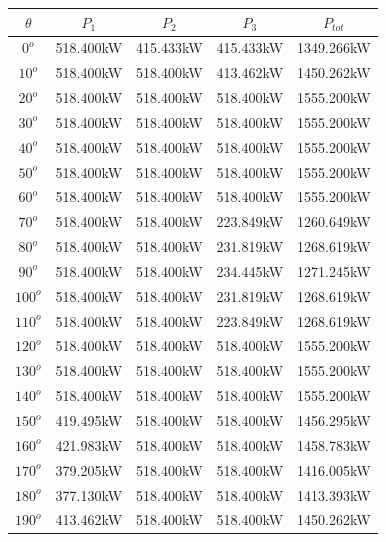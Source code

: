 	\singlespacing
	\begin{table}[H]
	    \centering
	    \begin{tabular}{|c|c|c|c|c|}
	     \hline
	     $\theta$ & $P_{1}$ & $P_{2}$ & $P_{3}$ & $P_{tot}$ \\
	     \hline
	     $0^{o}$ & 518.400kW & 415.433kW & 415.433kW & 1349.266kW \\
	     \hline
	     $10^{o}$ & 518.400kW & 518.400kW & 413.462kW & 1450.262kW \\
	     \hline
	     $20^{o}$ & 518.400kW & 518.400kW & 518.400kW & 1555.200kW \\
	     \hline
	     $30^{o}$ & 518.400kW & 518.400kW & 518.400kW & 1555.200kW \\
	     \hline
	     $40^{o}$ & 518.400kW & 518.400kW & 518.400kW & 1555.200kW \\
	     \hline
	     $50^{o}$ & 518.400kW & 518.400kW & 518.400kW & 1555.200kW \\
	     \hline
	     $60^{o}$ & 518.400kW & 518.400kW & 518.400kW & 1555.200kW \\
	     \hline
	     $70^{o}$ & 518.400kW & 518.400kW & 223.849kW & 1260.649kW \\
	     \hline
	     $80^{o}$ & 518.400kW & 518.400kW & 231.819kW & 1268.619kW \\
	     \hline
	     $90^{o}$ & 518.400kW & 518.400kW & 234.445kW & 1271.245kW \\
	     \hline
	     $100^{o}$ & 518.400kW & 518.400kW & 231.819kW & 1268.619kW \\
	     \hline
	     $110^{o}$ & 518.400kW & 518.400kW & 223.849kW & 1268.619kW \\
	     \hline
	     $120^{o}$ & 518.400kW & 518.400kW & 518.400kW & 1555.200kW \\
	     \hline
	     $130^{o}$ & 518.400kW & 518.400kW & 518.400kW & 1555.200kW \\
	     \hline
	     $140^{o}$ & 518.400kW & 518.400kW & 518.400kW & 1555.200kW \\
	     \hline
	     $150^{o}$ & 419.495kW & 518.400kW & 518.400kW & 1456.295kW \\
	     \hline
	     $160^{o}$ & 421.983kW & 518.400kW & 518.400kW & 1458.783kW \\
	     \hline
	     $170^{o}$ & 379.205kW & 518.400kW & 518.400kW & 1416.005kW \\
	     \hline
	     $180^{o}$ & 377.130kW & 518.400kW & 518.400kW & 1413.393kW \\
	     \hline
	     $190^{o}$ & 413.462kW & 518.400kW & 518.400kW & 1450.262kW \\

\end{tabular}
\end{table}
